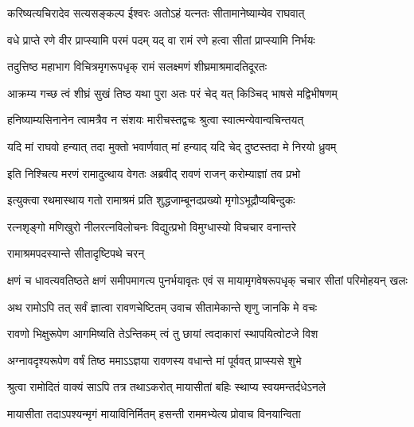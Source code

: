 \twolineshloka
{करिष्यत्यचिरादेव सत्यसङ्कल्प ईश्वरः}
{अतोऽहं यत्नतः सीतामानेष्याम्येव राघवात्} %

\twolineshloka
{वधे प्राप्ते रणे वीर प्राप्स्यामि परमं पदम्}
{यद् वा रामं रणे हत्वा सीतां प्राप्स्यामि निर्भयः} %

\twolineshloka
{तदुत्तिष्ठ महाभाग विचित्रमृगरूपधृक्}
{रामं सलक्ष्मणं शीघ्रमाश्रमादतिदूरतः} %

\twolineshloka
{आक्रम्य गच्छ त्वं शीघ्रं सुखं तिष्ठ यथा पुरा}
{अतः परं चेद् यत् किञ्चिद् भाषसे मद्विभीषणम्} %

\twolineshloka
{हनिष्याम्यसिनानेन त्वामत्रैव न संशयः}
{मारीचस्तद्वचः श्रुत्वा स्वात्मन्येवान्वचिन्तयत्} %

\twolineshloka
{यदि मां राघवो हन्यात् तदा मुक्तो भवार्णवात्}
{मां हन्याद् यदि चेद् दुष्टस्तदा मे निरयो ध्रुवम्} %

\twolineshloka
{इति निश्चित्य मरणं रामादुत्थाय वेगतः}
{अब्रवीद् रावणं राजन् करोम्याज्ञां तव प्रभो} %

\twolineshloka
{इत्युक्त्वा रथमास्थाय गतो रामाश्रमं प्रति}
{शुद्धजाम्बूनदप्रख्यो मृगोऽभूद्रौप्यबिन्दुकः} %

\twolineshloka
{रत्नशृङ्गो मणिखुरो नीलरत्नविलोचनः}
{विद्युत्प्रभो विमुग्धास्यो विचचार वनान्तरे} %

\onelineshloka
{रामाश्रमपदस्यान्ते सीतादृष्टिपथे चरन्} %


\fourlineindentedshloka
{क्षणं च धावत्यवतिष्ठते क्षणं}
{समीपमागत्य पुनर्भयावृतः}
{एवं स मायामृगवेषरूपधृक्}
{चचार सीतां परिमोहयन् खलः} %






\twolineshloka
{अथ रामोऽपि तत् सर्वं ज्ञात्वा रावणचेष्टितम्}
{उवाच सीतामेकान्ते शृणु जानकि मे वचः} %

\twolineshloka
{रावणो भिक्षुरूपेण आगमिष्यति तेऽन्तिकम्}
{त्वं तु छायां त्वदाकारां स्थापयित्वोटजे विश} %

\twolineshloka
{अग्नावदृश्यरूपेण वर्षं तिष्ठ ममाऽऽज्ञया}
{रावणस्य वधान्ते मां पूर्ववत् प्राप्स्यसे शुभे} %

\twolineshloka
{श्रुत्वा रामोदितं वाक्यं साऽपि तत्र तथाऽकरोत्}
{मायासीतां बहिः स्थाप्य स्वयमन्तर्दधेऽनले} %

\twolineshloka
{मायासीता तदाऽपश्यन्मृगं मायाविनिर्मितम्}
{हसन्ती राममभ्येत्य प्रोवाच विनयान्विता} %

